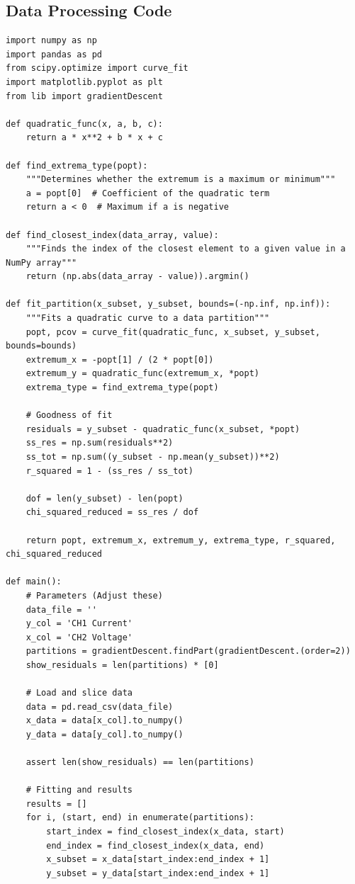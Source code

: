 \documentclass[12pt]{article}
\begin{document}
\subsection*{Data Processing Code}
\begin{lstlisting}
import numpy as np
import pandas as pd
from scipy.optimize import curve_fit
import matplotlib.pyplot as plt
from lib import gradientDescent

def quadratic_func(x, a, b, c):
    return a * x**2 + b * x + c

def find_extrema_type(popt):
    """Determines whether the extremum is a maximum or minimum"""
    a = popt[0]  # Coefficient of the quadratic term
    return a < 0  # Maximum if a is negative

def find_closest_index(data_array, value):
    """Finds the index of the closest element to a given value in a NumPy array"""
    return (np.abs(data_array - value)).argmin()

def fit_partition(x_subset, y_subset, bounds=(-np.inf, np.inf)):
    """Fits a quadratic curve to a data partition"""
    popt, pcov = curve_fit(quadratic_func, x_subset, y_subset, bounds=bounds)
    extremum_x = -popt[1] / (2 * popt[0])
    extremum_y = quadratic_func(extremum_x, *popt)
    extrema_type = find_extrema_type(popt)

    # Goodness of fit
    residuals = y_subset - quadratic_func(x_subset, *popt)
    ss_res = np.sum(residuals**2)
    ss_tot = np.sum((y_subset - np.mean(y_subset))**2)
    r_squared = 1 - (ss_res / ss_tot)

    dof = len(y_subset) - len(popt)
    chi_squared_reduced = ss_res / dof 

    return popt, extremum_x, extremum_y, extrema_type, r_squared, chi_squared_reduced

def main():
    # Parameters (Adjust these) 
    data_file = ''
    y_col = 'CH1 Current'  
    x_col = 'CH2 Voltage' 
    partitions = gradientDescent.findPart(gradientDescent.(order=2))
    show_residuals = len(partitions) * [0]

    # Load and slice data
    data = pd.read_csv(data_file)
    x_data = data[x_col].to_numpy()
    y_data = data[y_col].to_numpy()

    assert len(show_residuals) == len(partitions)  

    # Fitting and results
    results = [] 
    for i, (start, end) in enumerate(partitions):
        start_index = find_closest_index(x_data, start)
        end_index = find_closest_index(x_data, end)
        x_subset = x_data[start_index:end_index + 1] 
        y_subset = y_data[start_index:end_index + 1]


\end{lstlisting}
\end{document}
